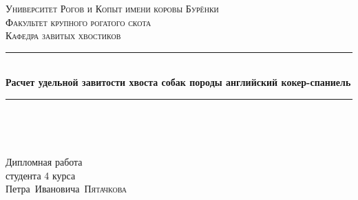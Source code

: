 %
%
%
%

\begin{titlepage}

\newcommand{\HRule}{\rule{\linewidth}{0.5mm}}

\center


\textsc{\LARGE Университет Рогов и Копыт имени коровы Бурёнки}\\[1cm]
\textsc{\Large Факультет крупного рогатого скота}\\[0.5cm]
\textsc{\large Кафедра завитых хвостиков}\\[1.2cm]

\HRule \\[0.4cm]
{ \huge \bfseries Расчет удельной завитости хвоста собак породы английский кокер-спаниель}\\[0.25cm]
\HRule \\[1.5cm]


\begin{minipage}[t]{0.4\textwidth}
\begin{flushleft}
~
\end{flushleft}
\end{minipage}
\hfill
\begin{minipage}[t]{0.4\textwidth}
\begin{flushright} \large
Дипломная работа\\
студента 4 курса\\
Петра\ Ивановича\ \textsc{Пятачкова}
\end{flushright}
\end{minipage}


\end{titlepage}

